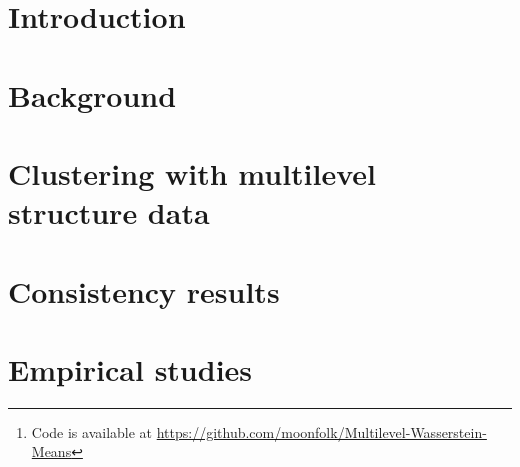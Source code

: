 \documentclass{article}
\theoremstyle{plain}
\theoremstyle{plain}
\numberwithin{theorem}{section}
\numberwithin{proposition}{section}
\numberwithin{lemma}{section}
\numberwithin{definition}{section}
\numberwithin{condition}{section}
\numberwithin{problem}{section}
\numberwithin{corollary}{section}
\numberwithin{assumption}{section}
\numberwithin{example}{section}
\numberwithin{conjecture}{section}
\theoremstyle{definition}
\numberwithin{remark}{section}
\begin{document}
\begin{abstract} 
We propose a novel approach to the problem of multilevel clustering, which aims to 
simultaneously partition data in each group and discover grouping patterns among groups
in a potentially large hierarchically structured corpus of data.
Our method involves a joint optimization formulation over several spaces of discrete probability measures,
which are endowed with Wasserstein distance metrics. We propose a number of variants
of this problem, which admit fast optimization algorithms, by exploiting the connection to the
problem of finding Wasserstein barycenters.  Consistency properties are established
for the estimates of both local and global clusters.
Finally, experiment results with both synthetic and real data are presented to demonstrate the 
flexibility and scalability of the proposed approach. \footnote{Code is available at \url{https://github.com/moonfolk/Multilevel-Wasserstein-Means}}
\end{abstract} 
\section{Introduction} \label{Section:introduction}


\section{Background} \label{Section:prelim}



\section{Clustering with multilevel structure data} \label{Section:multilevel_Wasserstein}



\section{Consistency results} \label{Section:consistency_multilevel_Kmeans}


\section{Empirical studies} \label{Section:data_analysis}

\vspace{-6pt}
\end{document}
